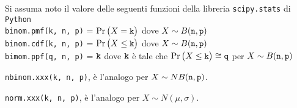 \documentclass[11pt,twoside,a4paper]{article}
\begin{document}
Si assuma noto il valore delle seguenti funzioni della libreria {\tt scipy.stats\/} di  {\tt Python\/}\\
{\tt binom.pmf(k, n, p)} = $\Pr\big(X={\tt k}\big)$ dove $X\sim B({\tt n},{\tt p})$\\
{\tt binom.cdf(k, n, p)} = $\Pr\big(X\le{\tt k}\big)$ dove  $X\sim B({\tt n},{\tt p})$ \\
{\tt bimom.ppf(q, n, p)} = ${\tt k}$ dove ${\tt k}$ è tale che $\Pr\big(X\le{\tt k}\big)\cong{\tt q}$ per $X\sim B({\tt n},{\tt p})$ 

{\tt nbinom.xxx(k, n, p)}, è l'analogo per $X\sim NB({\tt n},{\tt p})$.

{\tt norm.xxx(k, n, p)}, è l'analogo per $X\sim N(\mu,\sigma)$.
\end{document}
